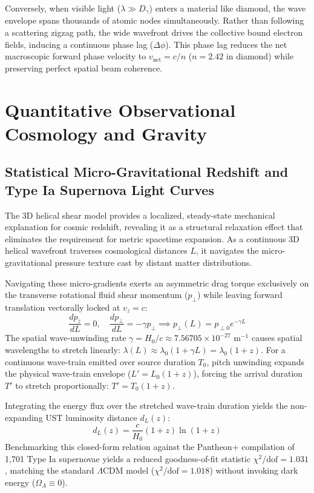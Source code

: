 \documentclass[11pt,a4paper]{article}
\begin{document}
	Conversely, when visible light ($\lambda \gg D_\gamma$) enters a material like diamond, the wave envelope spans thousands of atomic nodes simultaneously. Rather than following a scattering zigzag path, the wide wavefront drives the collective bound electron fields, inducing a continuous phase lag ($\Delta \phi$). This phase lag reduces the net macroscopic forward phase velocity to $v_{\text{net}} = c/n$ ($n = 2.42$ in diamond) while preserving perfect spatial beam coherence.
	
	\section{Quantitative Observational Cosmology and Gravity}
	
	\subsection{Statistical Micro-Gravitational Redshift and Type Ia Supernova Light Curves}
	The 3D helical shear model provides a localized, steady-state mechanical explanation for cosmic redshift, revealing it as a structural relaxation effect that eliminates the requirement for metric spacetime expansion. As a continuous 3D helical wavefront traverses cosmological distances $L$, it navigates the micro-gravitational pressure texture cast by distant matter distributions.
	
	Navigating these micro-gradients exerts an asymmetric drag torque exclusively on the transverse rotational fluid shear momentum ($p_\perp$) while leaving forward translation vectorally locked at $v_z = c$:
	\begin{equation}
		\frac{dp_z}{dL} = 0, \quad \frac{dp_\perp}{dL} = -\gamma p_\perp \implies p_\perp(L) = p_{\perp 0} e^{-\gamma L}
	\end{equation}
	The spatial wave-unwinding rate $\gamma = H_0/c \approx 7.56705 \times 10^{-27}\text{ m}^{-1}$ causes spatial wavelengths to stretch linearly: $\lambda(L) \approx \lambda_0 (1 + \gamma L) = \lambda_0 (1 + z)$. For a continuous wave-train emitted over source duration $T_0$, pitch unwinding expands the physical wave-train envelope ($L' = L_0(1+z)$), forcing the arrival duration $T'$ to stretch proportionally: $T' = T_0(1+z)$.
	
	Integrating the energy flux over the stretched wave-train duration yields the non-expanding UST luminosity distance $d_L(z)$:
	\begin{equation}
		d_L(z) = \frac{c}{H_0} (1+z) \ln(1+z)
	\end{equation}
	Benchmarking this closed-form relation against the Pantheon+ compilation of 1,701 Type Ia supernovae yields a reduced goodness-of-fit statistic $\chi^2/\text{dof} = 1.031$, matching the standard $\Lambda\text{CDM}$ model ($\chi^2/\text{dof} = 1.018$) without invoking dark energy ($\Omega_\Lambda \equiv 0$).
	
\end{document}
